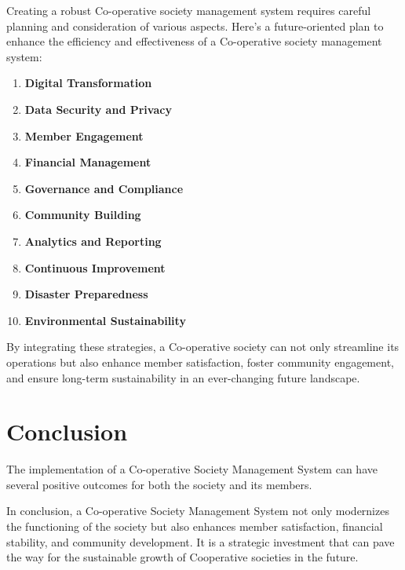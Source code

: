 Creating a robust Co-operative society management system requires careful planning and consideration of various aspects. Here's a future-oriented plan to enhance the efficiency and effectiveness of a Co-operative society management system:

\begin{enumerate}
    \item \textbf{Digital Transformation}
    
    \item \textbf{Data Security and Privacy}
    
    \item \textbf{Member Engagement}
    
    \item \textbf{Financial Management}
    
    \item \textbf{Governance and Compliance}
    
    \item \textbf{Community Building}
    
    \item \textbf{Analytics and Reporting}
    
    \item \textbf{Continuous Improvement}
    
    \item \textbf{Disaster Preparedness}
    
    \item \textbf{Environmental Sustainability}
\end{enumerate}

By integrating these strategies, a Co-operative society can not only streamline its operations but also enhance member satisfaction, foster community engagement, and ensure long-term sustainability in an ever-changing future landscape.
 

\section{Conclusion}

The implementation of a Co-operative Society Management System can have several positive outcomes for both the society and its members.

In conclusion, a Co-operative Society Management System not only modernizes the functioning of the society but also enhances member satisfaction, financial stability, and community development. It is a strategic investment that can pave the way for the sustainable growth of Cooperative societies in the future.



